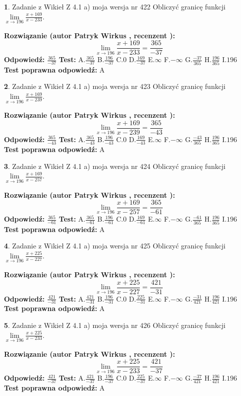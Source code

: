 \documentclass[12pt, a4paper]{article}
\theoremstyle{definition} %
\newtheorem{zad}{}
\newcommand{\zadStart}[1]{\begin{zad}#1\newline}
\newcommand{\zadStop}{\end{zad}}
\newcommand{\rozwStart}[2]{\noindent \textbf{Rozwiązanie (autor #1 , recenzent #2): }\newline}
\newcommand{\rozwStop}{\newline}
\newcommand{\odpStart}{\noindent \textbf{Odpowiedź:}\newline}
\newcommand{\odpStop}{\newline}
\newcommand{\testStart}{\noindent \textbf{Test:}\newline}
\newcommand{\testStop}{\newline}
\newcommand{\kluczStart}{\noindent \textbf{Test poprawna odpowiedź:}\newline}
\newcommand{\kluczStop}{\newline}
\begin{document}
\zadStart{Zadanie z Wikieł Z 4.1 a) moja wersja nr 422}
Obliczyć granicę funkcji $\lim\limits_{x\to196}\frac{x+169}{x-233}$.
\zadStop
\rozwStart{Patryk Wirkus}{}
$$\lim\limits_{x\to196}\frac{x+169}{x-233} = \frac{365}{-37}$$
\rozwStop
\odpStart
$\frac{365}{-37}$
\odpStop
\testStart
A.$\frac{365}{-37}$
B.$\frac{196}{-37}$
C.$0$
D.$\frac{169}{-37}$
E.$\infty$
F.$-\infty$
G.$\frac{-37}{365}$
H.$\frac{196}{365}$
I.$196$
\testStop
\kluczStart
A
\kluczStop



\zadStart{Zadanie z Wikieł Z 4.1 a) moja wersja nr 423}
Obliczyć granicę funkcji $\lim\limits_{x\to196}\frac{x+169}{x-239}$.
\zadStop
\rozwStart{Patryk Wirkus}{}
$$\lim\limits_{x\to196}\frac{x+169}{x-239} = \frac{365}{-43}$$
\rozwStop
\odpStart
$\frac{365}{-43}$
\odpStop
\testStart
A.$\frac{365}{-43}$
B.$\frac{196}{-43}$
C.$0$
D.$\frac{169}{-43}$
E.$\infty$
F.$-\infty$
G.$\frac{-43}{365}$
H.$\frac{196}{365}$
I.$196$
\testStop
\kluczStart
A
\kluczStop



\zadStart{Zadanie z Wikieł Z 4.1 a) moja wersja nr 424}
Obliczyć granicę funkcji $\lim\limits_{x\to196}\frac{x+169}{x-257}$.
\zadStop
\rozwStart{Patryk Wirkus}{}
$$\lim\limits_{x\to196}\frac{x+169}{x-257} = \frac{365}{-61}$$
\rozwStop
\odpStart
$\frac{365}{-61}$
\odpStop
\testStart
A.$\frac{365}{-61}$
B.$\frac{196}{-61}$
C.$0$
D.$\frac{169}{-61}$
E.$\infty$
F.$-\infty$
G.$\frac{-61}{365}$
H.$\frac{196}{365}$
I.$196$
\testStop
\kluczStart
A
\kluczStop



\zadStart{Zadanie z Wikieł Z 4.1 a) moja wersja nr 425}
Obliczyć granicę funkcji $\lim\limits_{x\to196}\frac{x+225}{x-227}$.
\zadStop
\rozwStart{Patryk Wirkus}{}
$$\lim\limits_{x\to196}\frac{x+225}{x-227} = \frac{421}{-31}$$
\rozwStop
\odpStart
$\frac{421}{-31}$
\odpStop
\testStart
A.$\frac{421}{-31}$
B.$\frac{196}{-31}$
C.$0$
D.$\frac{225}{-31}$
E.$\infty$
F.$-\infty$
G.$\frac{-31}{421}$
H.$\frac{196}{421}$
I.$196$
\testStop
\kluczStart
A
\kluczStop



\zadStart{Zadanie z Wikieł Z 4.1 a) moja wersja nr 426}
Obliczyć granicę funkcji $\lim\limits_{x\to196}\frac{x+225}{x-233}$.
\zadStop
\rozwStart{Patryk Wirkus}{}
$$\lim\limits_{x\to196}\frac{x+225}{x-233} = \frac{421}{-37}$$
\rozwStop
\odpStart
$\frac{421}{-37}$
\odpStop
\testStart
A.$\frac{421}{-37}$
B.$\frac{196}{-37}$
C.$0$
D.$\frac{225}{-37}$
E.$\infty$
F.$-\infty$
G.$\frac{-37}{421}$
H.$\frac{196}{421}$
I.$196$
\testStop
\kluczStart
A
\kluczStop
\end{document}
